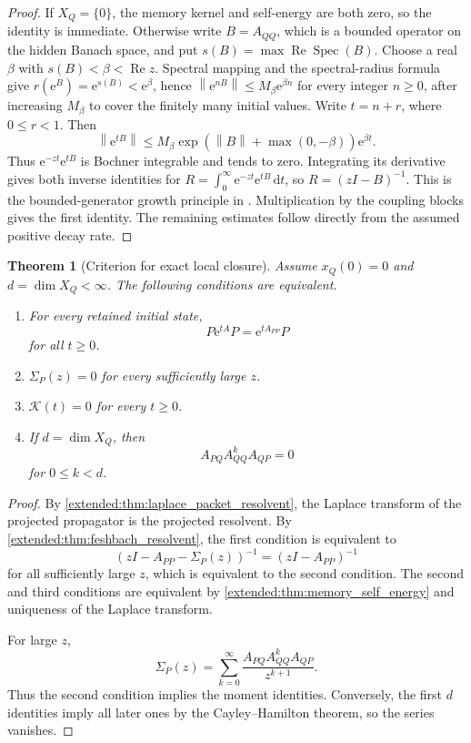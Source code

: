 \documentclass[11pt,letterpaper]{article}
\newtheorem{theorem}{Theorem}[section]
\theoremstyle{plain}
\theoremstyle{plain}
\theoremstyle{plain}
\theoremstyle{definition}
\theoremstyle{definition}
\theoremstyle{definition}
\theoremstyle{definition}
\theoremstyle{definition}
\theoremstyle{remark}
\theoremstyle{remark}
\theoremstyle{remark}
\theoremstyle{remark}
\theoremstyle{remark}
\newcommand{\Spec}{\operatorname{Spec}}
\newcommand{\norm}[1]{\left\lVert#1\right\rVert}
\theoremstyle{remark}
\newcommand{\Kcal}{\mathcal K}
\newcommand{\e}{\mathrm e}
\newcommand{\dd}{\,\mathrm d}
\let\KomorebiPrimitiveMathcal\mathcal
\renewcommand{\mathcal}[1]{{\KomorebiPrimitiveMathcal{#1}}}
\let\KomorebiPrimitivemathrm\mathrm
\renewcommand{\mathrm}[1]{{\KomorebiPrimitivemathrm{#1}}}
\begin{document}
\begin{proof}
If \(X_Q=\{0\}\), the memory kernel and self-energy are both zero, so the identity is immediate. Otherwise write \(B=A_{QQ}\), which is a bounded operator on the hidden Banach space, and put \(s(B)=\max\operatorname{Re}\Spec(B)\). Choose a real \(\beta\) with \(s(B)<\beta<\operatorname{Re}z\). Spectral mapping and the spectral-radius formula give \(r(\e^B)=\e^{s(B)}<\e^\beta\), hence \(\norm{\e^{nB}}\leq M_\beta\e^{\beta n}\) for every integer \(n\geq0\), after increasing \(M_\beta\) to cover the finitely many initial values. Write \(t=n+r\), where \(0\leq r<1\). Then
\[
\norm{\e^{tB}}\leq M_\beta\exp(\norm B+\max(0,-\beta))\e^{\beta t}.
\]
Thus \(\e^{-zt}\e^{tB}\) is Bochner integrable and tends to zero. Integrating its derivative gives both inverse identities for \(R=\int_0^\infty\e^{-zt}\e^{tB}\dd t\), so \(R=(zI-B)^{-1}\). This is the bounded-generator growth principle in \cite[Chapter IV, Corollary 3.12]{EngelNagel2000}. Multiplication by the coupling blocks gives the first identity. The remaining estimates follow directly from the assumed positive decay rate.
\end{proof}

\begin{theorem}[Criterion for exact local closure]\label{extended:record:087}\label{extended:thm:local_closure}
Assume \(x_Q(0)=0\) and \(d=\dim X_Q<\infty\). The following conditions are equivalent.
\begin{enumerate}
\item For every retained initial state,
\[
P\e^{tA}P
=
\e^{tA_{PP}}P
\]
for all \(t\geq0\).
\item \(\Sigma_P(z)=0\) for every sufficiently large \(z\).
\item \(\Kcal(t)=0\) for every \(t\geq0\).
\item If \(d=\dim X_Q\), then
\[
A_{PQ}A_{QQ}^kA_{QP}=0
\]
for \(0\leq k<d\).
\end{enumerate}
\end{theorem}

\begin{proof}
By \cref{extended:thm:laplace_packet_resolvent}, the Laplace transform of the projected propagator is the projected resolvent. By \cref{extended:thm:feshbach_resolvent}, the first condition is equivalent to
\[
(zI-A_{PP}-\Sigma_P(z))^{-1}
=
(zI-A_{PP})^{-1}
\]
for all sufficiently large \(z\), which is equivalent to the second condition. The second and third conditions are equivalent by \cref{extended:thm:memory_self_energy} and uniqueness of the Laplace transform.

For large \(z\),
\[
\Sigma_P(z)
=
\sum_{k=0}^{\infty}
\frac{A_{PQ}A_{QQ}^kA_{QP}}{z^{k+1}}.
\]
Thus the second condition implies the moment identities. Conversely, the first \(d\) identities imply all later ones by the Cayley--Hamilton theorem, so the series vanishes.
\end{proof}
\end{document}
